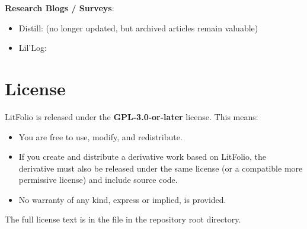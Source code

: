 \textbf{Research Blogs / Surveys}:

\begin{itemize}
  \item Distill:  (no longer updated, but archived
    articles remain valuable)
  \item Lil'Log: 
\end{itemize}

\chapter{License}
\label{appx:license}

LitFolio is released under the \textbf{GPL-3.0-or-later} license. This means:

\begin{itemize}
  \item You are free to use, modify, and redistribute.
  \item If you create and distribute a derivative work based on LitFolio, the derivative
    must also be released under the same license (or a compatible more permissive license)
    and include source code.
  \item No warranty of any kind, express or implied, is provided.
\end{itemize}

The full license text is in the  file in the repository root directory.
